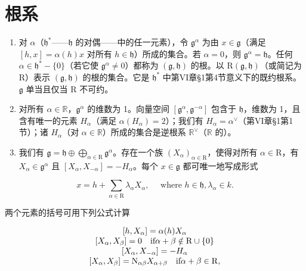 \section*{根系}

\begin{enumerate}
\def\labelenumi{\arabic{enumi})}
\setcounter{enumi}{4}
\item
  对 \(\alpha\)（\(\mathfrak{h}^*\)——\(\mathfrak{h}\) 的对偶——中的任一元素），令 \(\mathfrak{g}^{\alpha}\) 为由 \(x\in \mathfrak{g}\)（满足 \([h,x] = \alpha (h)x\) 对所有 \(h\in \mathfrak{h}\)）所成的集合。若 \(\alpha = 0\)，则 \(\mathfrak{g}^{\alpha} = \mathfrak{h}\)。任何 \(\alpha \in \mathfrak{h}^{*} - \{0\}\)（若它使 \(\mathfrak{g}^{\alpha}\neq 0\)）都称为 \((\mathfrak{g},\mathfrak{h})\) 的根。以 \(\mathrm{R}(\mathfrak{g},\mathfrak{h})\)（或简记为 R）表示 \((\mathfrak{g},\mathfrak{h})\) 的根的集合。它是 \(\mathfrak{h}^*\) 中第VI章§1第4节意义下的既约根系。\(\mathfrak{g}\) 单当且仅当 R 不可约。
\item
  对所有 \(\alpha \in \mathbb{R}\)，\(\mathfrak{g}^{\alpha}\) 的维数为 1。向量空间 \([\mathfrak{g}^{\alpha}, \mathfrak{g}^{-\alpha}]\) 包含于 \(\mathfrak{h}\)，维数为 1，且含有唯一的元素 \(H_{\alpha}\)（满足 \(\alpha(H_{\alpha}) = 2\)）；我们有 \(H_{\alpha} = \alpha^{\vee}\)（第VI章§1第1节）；诸 \(H_{\alpha}\)（对 \(\alpha \in \mathbb{R}\)）所成的集合是逆根系 \(\mathbb{R}^{\vee}\)（\(\mathbb{R}\) 的）。
\item
  我们有 \(\mathfrak{g} = \mathfrak{h} \oplus \bigoplus_{\alpha \in \mathrm{R}} \mathfrak{g}^{\alpha}\)。存在一个族 \((X_{\alpha})_{\alpha \in \mathrm{R}}\)，使得对所有 \(\alpha \in \mathrm{R}\)，有 \(X_{\alpha} \in \mathfrak{g}^{\alpha}\) 且 \([X_{\alpha}, X_{-\alpha}] = -H_{\alpha}\)。每个 \(x \in \mathfrak{g}\) 都可唯一地写成形式
\end{enumerate}

\[
x = h + \sum_ {\alpha \in \mathrm{R}} \lambda_ {\alpha} X _ {\alpha}, \quad \text { where } h \in \mathfrak {h}, \lambda_ {\alpha} \in k.
\]

两个元素的括号可用下列公式计算

\[
\begin{array}{c} [ h, X _ {\alpha} ] = \alpha (h) X _ {\alpha} \\ \relax [ X _ {\alpha}, X _ {\beta} ] = 0 \quad \text {if} \alpha + \beta \notin \mathrm{R} \cup \{0 \} \\ \relax [ X _ {\alpha}, X _ {- \alpha} ] = - H _ {\alpha} \\ \relax [ X _ {\alpha}, X _ {\beta} ] = \mathrm{N} _ {\alpha \beta} X _ {\alpha + \beta} \quad \text {if} \alpha + \beta \in \mathrm{R}, \end{array}
\]

